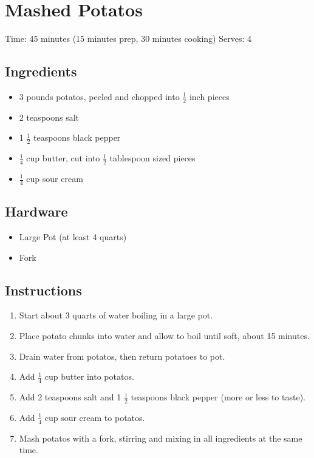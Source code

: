 \section{Mashed Potatos}
\label{mashedPotatos}
\setcounter{secnumdepth}{0}
Time: 45 minutes (15 minutes prep, 30 minutes cooking)
Serves: 4

\begin{multicols}{2}
\subsection*{Ingredients}
\begin{itemize}
    \item 3 pounds potatos, peeled and chopped into \( \frac{1}{2} \) inch pieces
    \item 2 teaspoons salt
    \item 1 \( \frac{1}{2} \) teaspoons black pepper
    \item \( \frac{1}{4} \) cup butter, cut into \( \frac{1}{2} \) tablespoon sized pieces
    \item \( \frac{1}{4} \) cup sour cream
\end{itemize}

\subsection*{Hardware}
\begin{itemize}
    \item Large Pot (at least 4 quarts)
    \item Fork
\end{itemize}
\clearpage

\subsection*{Instructions}
\begin{enumerate}
    \item Start about 3 quarts of water boiling in a large pot.
    \item Place potato chunks into water and allow to boil until soft, about 15 minutes.
    \item Drain water from potatos, then return potatoes to pot.
    \item Add \( \frac{1}{4} \) cup butter into potatos.
    \item Add 2 teaspoons salt and 1 \( \frac{1}{2} \) teaspoons black pepper (more or less to taste).
    \item Add \( \frac{1}{4} \) cup sour cream to potatos.
    \item Mash potatos with a fork, stirring and mixing in all ingredients at the same time.
\end{enumerate}


\end{multicols}

